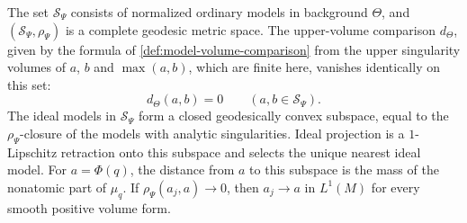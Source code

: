 \begin{proposition}\label{prop:divisorial-product-polar-metric}
The set $\mathcal S_\Psi$ consists of normalized ordinary models in background $\Theta$, and $(\mathcal S_\Psi,\rho_\Psi)$ is a complete geodesic metric space. The upper-volume comparison $d_\Theta$, given by the formula of \cref{def:model-volume-comparison} from the upper singularity volumes of $a$, $b$ and $\max(a,b)$, which are finite here, vanishes identically on this set:
\[
 d_\Theta(a,b)=0\qquad(a,b\in\mathcal S_\Psi).
\]
The ideal models in $\mathcal S_\Psi$ form a closed geodesically convex subspace, equal to the $\rho_\Psi$-closure of the models with analytic singularities. Ideal projection is a $1$-Lipschitz retraction onto this subspace and selects the unique nearest ideal model. For $a=\Phi(q)$, the distance from $a$ to this subspace is the mass of the nonatomic part of $\mu_q$. If $\rho_\Psi(a_j,a)\to0$, then $a_j\to a$ in $L^1(M)$ for every smooth positive volume form.
\end{proposition}
